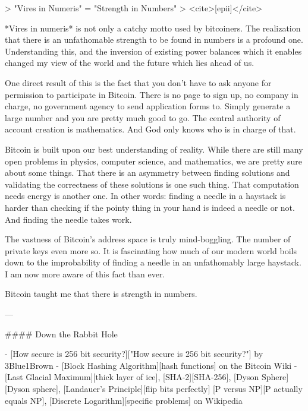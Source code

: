 {{> "Vires in Numeris" = "Strength in Numbers"
> <cite>[epii]</cite>

*Vires in numeris* is not only a catchy motto used by bitcoiners. The
realization that there is an unfathomable strength to be found in
numbers is a profound one. Understanding this, and the inversion of
existing power balances which it enables changed my view of the world
and the future which lies ahead of us.

One direct result of this is the fact that you don't have to ask anyone
for permission to participate in Bitcoin. There is no page to sign up,
no company in charge, no government agency to send application forms to.
Simply generate a large number and you are pretty much good to go. The
central authority of account creation is mathematics. And God only knows
who is in charge of that.

{%

Bitcoin is built upon our best understanding of reality. While there are
still many open problems in physics, computer science, and mathematics,
we are pretty sure about some things. That there is an asymmetry between
finding solutions and validating the correctness of these solutions is
one such thing. That computation needs energy is another one. In other
words: finding a needle in a haystack is harder than checking if the
pointy thing in your hand is indeed a needle or not. And finding the
needle takes work.

The vastness of Bitcoin's address space is truly mind-boggling. The
number of private keys even more so. It is fascinating how much of our
modern world boils down to the improbability of finding a needle in an
unfathomably large haystack. I am now more aware of this fact than ever.

Bitcoin taught me that there is strength in numbers.

---

#### Down the Rabbit Hole

- [How secure is 256 bit security?]["How secure is 256 bit security?"] by 3Blue1Brown
- [Block Hashing Algorithm][hash functions] on the Bitcoin Wiki
- [Last Glacial Maximum][thick layer of ice], [SHA-2][SHA-256], [Dyson Sphere][Dyson sphere], [Landauer's Principle][flip bits perfectly] [P versus NP][P actually equals NP], [Discrete Logarithm][specific problems] on Wikipedia

}}}
